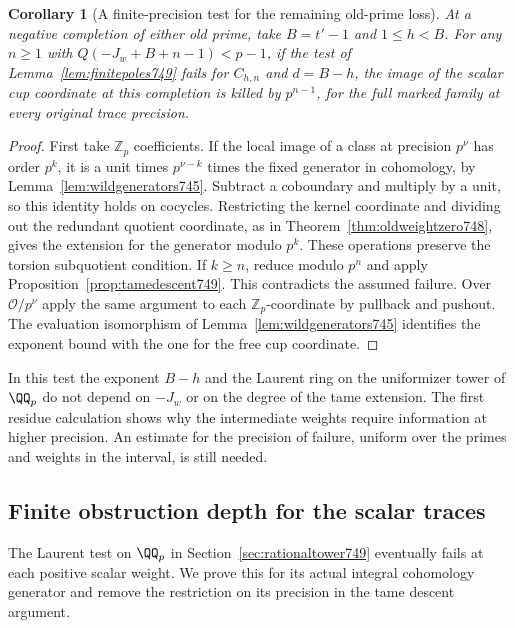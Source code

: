 \documentclass[a4paper,11pt]{article}
\newtheorem{corollary}[proposition]{Corollary}
\theoremstyle{definition}
\theoremstyle{remark}
\numberwithin{equation}{section}
\begin{document}
\begin{corollary}[A finite-precision test for the remaining old-prime loss]
\leavevmode\label{cor:finitepositive749}
At a negative completion of either old prime, take \(B=t'-1\)
and \(1\le h<B\). For any \(n\ge1\) with \(Q(-J_w+B+n-1)<p-1\),
if the test of Lemma~\ref{lem:finitepoles749} fails for
\(C_{h,n}\) and \(d=B-h\), the image of the scalar cup coordinate
at this completion is killed by \(p^{n-1}\), for the full marked
family at every original trace precision.
\end{corollary}
\begin{proof}
First take \(\mathbb Z_p\) coefficients. If the local image of a
class at precision \(p^\nu\) has order \(p^k\), it is a unit
times \(p^{\nu-k}\) times the fixed generator in cohomology,
by Lemma~\ref{lem:wildgenerators745}. Subtract a coboundary
and multiply by a unit, so this identity holds on cocycles.
Restricting the kernel coordinate and dividing out the redundant
quotient coordinate, as in Theorem~\ref{thm:oldweightzero748},
gives the extension for the generator modulo \(p^k\). These
operations preserve the torsion subquotient condition. If
\(k\ge n\), reduce modulo \(p^n\) and apply
Proposition~\ref{prop:tamedescent749}. This contradicts the
assumed failure. Over \(\mathcal O/p^\nu\) apply the same
argument to each \(\mathbb Z_p\)-coordinate by pullback and
pushout. The evaluation isomorphism of
Lemma~\ref{lem:wildgenerators745} identifies the exponent bound
with the one for the free cup coordinate.
\end{proof}

In this test the exponent \(B-h\) and the Laurent ring on the uniformizer
tower of \(\QQ_p\) do not depend on \(-J_w\) or on
the degree of the tame extension. The first residue calculation
shows why the intermediate weights require information at higher
precision. An estimate for the precision of failure, uniform
over the primes and weights in the interval, is still needed.
\clearpage

\subsection{Finite obstruction depth for the scalar traces}
\label{sec:finiteobstruction750}
The Laurent test on \(\QQ_p\) in Section~\ref{sec:rationaltower749}
eventually fails at each positive scalar weight. We prove this
for its actual integral cohomology generator and remove the
restriction on its precision in the tame descent argument.
\end{document}
